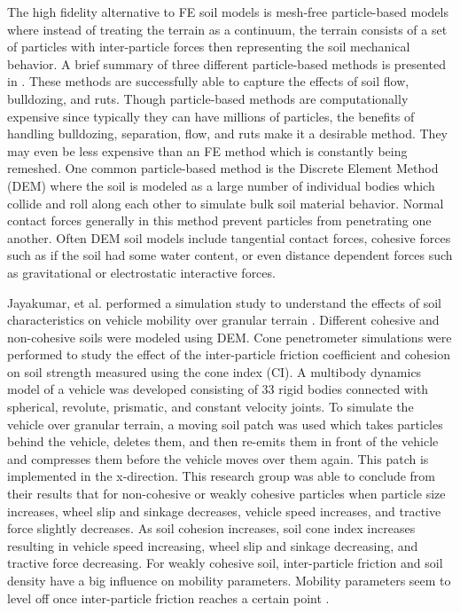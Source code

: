 \documentclass[12pt,onecolumn]{report}
\begin{document}
The high fidelity alternative to FE soil models is mesh-free particle-based models where instead of treating the terrain as a continuum, the terrain consists of a set of particles with inter-particle forces then representing the soil mechanical behavior. A brief summary of three different particle-based methods is presented in \cite{SoilCharacteristics2017}. These methods are successfully able to capture the effects of soil flow, bulldozing, and ruts. Though particle-based methods are computationally expensive since typically they can have millions of particles, the benefits of handling bulldozing, separation, flow, and ruts make it a desirable method. They may even be less expensive than an FE method which is constantly being remeshed. One common particle-based method is the Discrete Element Method (DEM) where the soil is modeled as a large number of individual bodies which collide and roll along each other to simulate bulk soil material behavior. Normal contact forces generally in this method prevent particles from penetrating one another. Often DEM soil models include tangential contact forces, cohesive forces such as if the soil had some water content, or even distance dependent forces such as gravitational or electrostatic interactive forces. 

Jayakumar, et al. performed a simulation study to understand the effects of soil characteristics on vehicle mobility over granular terrain \cite{SoilCharacteristics2017}. Different cohesive and non-cohesive soils were modeled using DEM. Cone penetrometer simulations were performed to study the effect of the inter-particle friction coefficient and cohesion on soil strength measured using the cone index (CI). A multibody dynamics model of a vehicle was developed consisting of 33 rigid bodies connected with spherical, revolute, prismatic, and constant velocity joints. To simulate the vehicle over granular terrain, a moving soil patch was used which takes particles behind the vehicle, deletes them, and then re-emits them in front of the vehicle and compresses them before the vehicle moves over them again. This patch is implemented in the x-direction. This research group was able to conclude from their results that for non-cohesive or weakly cohesive particles when particle size increases, wheel slip and sinkage decreases, vehicle speed increases, and tractive force slightly decreases. As soil cohesion increases, soil cone index increases resulting in vehicle speed increasing, wheel slip and sinkage decreasing, and tractive force decreasing. For weakly cohesive soil, inter-particle friction and soil density have a big influence on mobility parameters. Mobility parameters seem to level off once inter-particle friction reaches a certain point \cite{SoilCharacteristics2017}.
\end{document}
